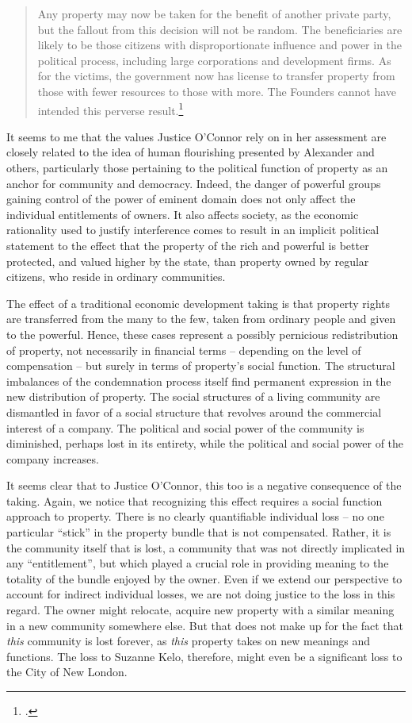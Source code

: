 \documentclass[12pt,a4paper]{book} %
\begin{document}
\begin{quote}
Any property may now be taken for the benefit of another private party, but the fallout from this decision will not be random. The beneficiaries are likely to be those citizens with disproportionate influence and power in the political process, including large corporations and development firms. As for the victims, the government now has license to transfer property from those with fewer resources to those with more. The Founders cannot have intended this perverse result.\footcite[505]{kelo05}
\end{quote}

It seems to me that the values Justice O'Connor rely on in her assessment are closely related to the idea of human flourishing presented by Alexander and others, particularly those pertaining to the political function of property as an anchor for community and democracy. Indeed, the danger of powerful groups gaining control of the power of eminent domain does not only affect the individual entitlements of owners. It also affects society, as the economic rationality used to justify interference comes to result in an implicit political statement to the effect that the property of the rich and powerful is better protected, and valued higher by the state, than property owned by regular citizens, who reside in ordinary communities.

The effect of a traditional economic development taking is that property rights are transferred from the many to the few, taken from ordinary people and given to the powerful. Hence, these cases represent a possibly pernicious redistribution of property, not necessarily in financial terms -- depending on the level of compensation -- but surely in terms of property's social function. The structural imbalances of the condemnation process itself find permanent expression in the new distribution of property. The social structures of a living community are dismantled in favor of a social structure that revolves around the commercial interest of a company. The political and social power of the community is diminished, perhaps lost in its entirety, while the political and social power of the company increases.

It seems clear that to Justice O'Connor, this too is a negative consequence of the taking. Again, we notice that recognizing this effect requires a social function approach to property. There is no clearly quantifiable individual loss -- no one particular ``stick'' in the property bundle that is not compensated. Rather, it is the community itself that is lost, a community that was not directly implicated in any ``entitlement'', but which played a crucial role in providing meaning to the totality of the bundle enjoyed by the owner. Even if we extend our perspective to account for indirect individual losses, we are not doing justice to the loss in this regard. The owner might relocate, acquire new property with a similar meaning in a new community somewhere else. But that does not make up for the fact that {\it this} community is lost forever, as {\it this} property takes on new meanings and functions. The loss to Suzanne Kelo, therefore, might  even be a significant loss to the City of New London.
\end{document}
